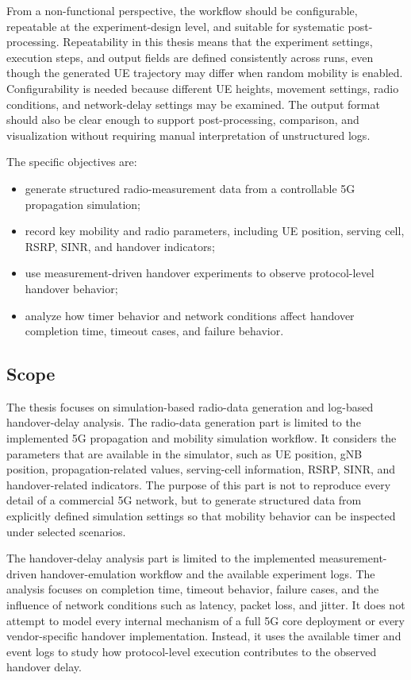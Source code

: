 From a non-functional perspective, the workflow should be configurable, repeatable at the experiment-design level, and suitable for systematic post-processing. Repeatability in this thesis means that the experiment settings, execution steps, and output fields are defined consistently across runs, even though the generated UE trajectory may differ when random mobility is enabled. Configurability is needed because different UE heights, movement settings, radio conditions, and network-delay settings may be examined. The output format should also be clear enough to support post-processing, comparison, and visualization without requiring manual interpretation of unstructured logs.

The specific objectives are:

\begin{itemize}
    \item generate structured radio-measurement data from a controllable 5G propagation simulation;
    \item record key mobility and radio parameters, including UE position, serving cell, RSRP, SINR, and handover indicators;
    \item use measurement-driven handover experiments to observe protocol-level handover behavior;
    \item analyze how timer behavior and network conditions affect handover completion time, timeout cases, and failure behavior.
\end{itemize}

\subsection{Scope}

The thesis focuses on simulation-based radio-data generation and log-based handover-delay analysis. The radio-data generation part is limited to the implemented 5G propagation and mobility simulation workflow. It considers the parameters that are available in the simulator, such as UE position, gNB position, propagation-related values, serving-cell information, RSRP, SINR, and handover-related indicators. The purpose of this part is not to reproduce every detail of a commercial 5G network, but to generate structured data from explicitly defined simulation settings so that mobility behavior can be inspected under selected scenarios.

The handover-delay analysis part is limited to the implemented measurement-driven handover-emulation workflow and the available experiment logs. The analysis focuses on completion time, timeout behavior, failure cases, and the influence of network conditions such as latency, packet loss, and jitter. It does not attempt to model every internal mechanism of a full 5G core deployment or every vendor-specific handover implementation. Instead, it uses the available timer and event logs to study how protocol-level execution contributes to the observed handover delay.

